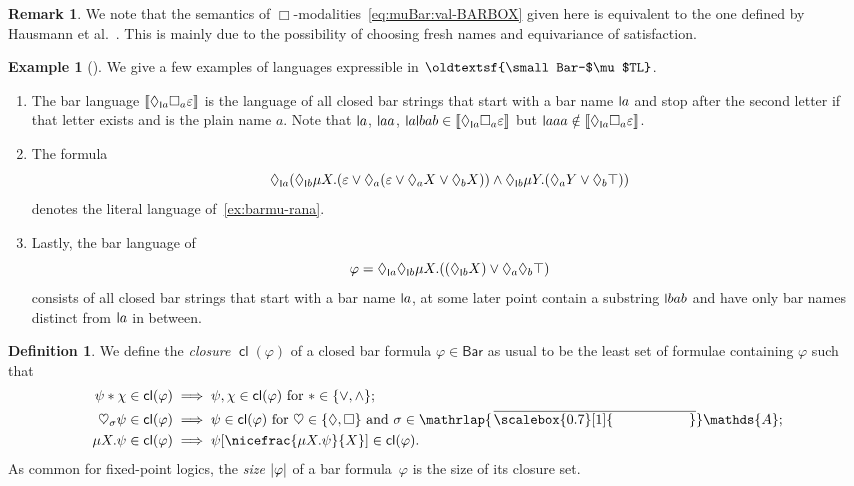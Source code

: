 \documentclass[10pt,a4paper]{amsart}
\theoremstyle{definition}
\newtheorem{defn}[theo]{Definition}
\newtheorem{example}[theo]{Example}
\newtheorem{rem}[theo]{Remark}
\newcommand{\resetCurThmBraces}{%
\gdef\curThmBraceOpen{(}%
\gdef\curThmBraceClose{)}}
\newcommand{\removeThmBraces}{%
\gdef\curThmBraceOpen{}%
\gdef\curThmBraceClose{}}
\renewcommand{\textsf}[1]{{\oldtextsf{\small#1}}}
\newcommand{\muBar}{\mbox{\textsf{Bar-$\mu$TL}}\xspace}
\newcommand{\At}{\mathds{A}}
\newcommand{\sem}[1]{\llbracket #1 \rrbracket}
\newcommand{\op}[1]{\operatorname{\mathsf{#1}}}
\newcommand{\cl}{\op{cl}}
\newcommand{\card}[1]{\left\vert#1\right\vert}
\newcommand{\names}{\At}
\newcommand{\set}[1]{\{#1\}}
\newcommand{\mybar}[3]{%
  \mathrlap{\hspace{#2}\overline{\scalebox{#1}[1]{\phantom{\ensuremath{#3}}}}}\ensuremath{#3}
}
\newcommand{\BarForm}{\mathsf{Bar}}
\newcommand{\barNames}{{\mybar{0.7}{1.25pt}{\names}}}
\newcommand{\midmid}{\hspace{0.2ex}{\rule[-0.1ex]{0.6pt}{1.65ex}}\hspace{0.2ex}}
\newcommand{\scriptmidmid}{\hspace{0.2ex}{\rule[-0.1ex]{0.6pt}{1.1ex}}\hspace{0.2ex}}
\newcommand{\newletter}[1]{{\midmid}#1}
\newcommand{\scriptnew}[1]{{\scriptmidmid}#1}
\let\originalleft\left
\let\originalright\right
\renewcommand{\left}{\mathopen{}\mathclose\bgroup\originalleft}
\renewcommand{\right}{\aftergroup\egroup\originalright}
\begin{document}
\begin{rem} \label{rem:sem-equivalence}
  We note that the semantics of
  $\Box$-modalities~\eqref{eq:muBar:val-BARBOX} given here is equivalent to the one 
  defined by Hausmann et al.~\cite{hms21}. This is mainly due to the possibility of choosing
  fresh names and equivariance of satisfaction.
\end{rem}

\removeThmBraces
\begin{example}[{{\cite[Ex.~4.8]{hms21}}}] \label{ex:barmutls}
  We give a few examples of languages expressible in $\muBar$. 
  \begin{enumerate}
    \item The bar language $\sem{\Diamond_{\scriptnew{a}}\Box_a\varepsilon}$ is the language of all closed bar strings that
      start with a bar name $\newletter{a}$ and stop after the second letter if that letter exists and is the plain name $a$. Note that $\newletter{a}$, $\newletter{a}a$, $\newletter{a}\newletter{b}ab \in \sem{\Diamond_{\scriptnew{a}}\Box_a\varepsilon}$ but $\newletter{a}aa \notin \sem{\Diamond_{\scriptnew{a}}\Box_a\varepsilon}$.
    \item The formula
      \[\Diamond_{\scriptnew{a}}(\Diamond_{\scriptnew{b}}\mu X.(\varepsilon \vee \Diamond_a(\varepsilon \vee \Diamond_a X \vee \Diamond_b X)) \wedge \Diamond_{\scriptnew{b}}\mu Y.(\Diamond_a Y \vee \Diamond_b \top))\]
      denotes the literal language of~\cref{ex:barmu-rana}.
    \item\label{ex:barmutls:3} Lastly, the bar language of \[\varphi = \Diamond_{\scriptnew{a}}\Diamond_{\scriptnew{b}}\mu X. ((\Diamond_{\scriptnew{b}}X) \vee \Diamond_a\Diamond_b\top)\]
      consists of all closed bar strings that start with a bar name $\newletter{a}$, at some later point contain a
      substring $\newletter{b}ab$ and have only bar names distinct from $\newletter{a}$ in between.
  \end{enumerate}
\end{example}
\resetCurThmBraces


\begin{defn}
  We define the \emph{closure} $\cl(\varphi)$ of a closed bar formula $\varphi \in
  \BarForm$ as usual to be the least
  set of formulae containing $\varphi$ such that
  \begin{align*}
    \psi \ast \chi \in \cl(\varphi) &\text{${}\implies \psi, \chi \in \cl(\varphi)$ for $\ast \in \set{\vee, \wedge}$};\\
    \heartsuit_\sigma \psi \in \cl(\varphi) &{}\implies \psi \in \cl(\varphi)\ \text{for $\heartsuit \in  \set{\Diamond, \Box}$ and $\sigma \in \barNames$};\\
    \mu X. \psi \in \cl(\varphi) &{}\implies \psi[\nicefrac{\mu X.\psi}{X}] \in \cl(\varphi).  
  \end{align*}
  As common for fixed-point logics, the \emph{size} $\card{\varphi}$ of a bar formula~$\varphi$ is the size of its closure set.
\end{defn}
\end{document}
